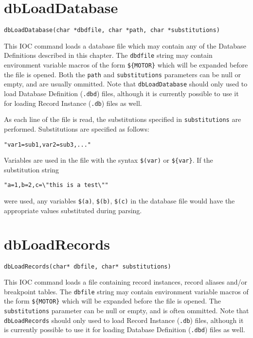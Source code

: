 \section{dbLoadDatabase}

\begin{verbatim}
dbLoadDatabase(char *dbdfile, char *path, char *substitutions)
\end{verbatim}

This IOC command loads a database file which may contain any of the Database Definitions described in this chapter.
The \verb|dbdfile| string may contain environment variable macros of the form \verb|${MOTOR}| which will be expanded before the file is opened.
Both the \verb|path| and \verb|substitutions| parameters can be null or empty, and are usually ommitted.
Note that \verb|dbLoadDatabase| should only used to load Database Definition (\verb|.dbd|) files, although it is currently possible to use it for loading Record Instance (\verb|.db|) files as well.

As each line of the file is read, the substitutions specified in \verb|substitutions| are performed. Substitutions are specified as follows:

\begin{verbatim}
"var1=sub1,var2=sub3,..."
\end{verbatim}

Variables are used in the file with the syntax \verb|$(var)| or \verb|${var}|.
If the substitution string

\begin{verbatim}
"a=1,b=2,c=\"this is a test\""
\end{verbatim}

were used, any variables \verb|$(a)|, \verb|$(b)|, \verb|$(c)| in the database file would have the appropriate values substituted during parsing.

\section{dbLoadRecords}

\begin{verbatim}
dbLoadRecords(char* dbfile, char* substitutions)
\end{verbatim}

This IOC command loads a file containing record instances, record aliases and/or breakpoint tables.
The \verb|dbfile| string may contain environment variable macros of the form \verb|${MOTOR}| which will be expanded before the file is opened.
The \verb|substitutions| parameter can be null or empty, and is often ommitted.
Note that \verb|dbLoadRecords| should only used to load Record Instance (\verb|.db|) files, although it is currently possible to use it for loading Database Definition (\verb|.dbd|) files as well.

